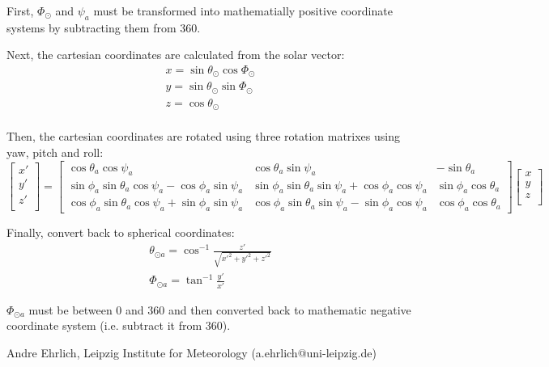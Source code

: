 { %
First, $\Phi_\odot$ and $\psi_a$ must be transformed into mathematially positive coordinate systems by subtracting them from 360. 

Next, the cartesian coordinates are calculated from the solar vector:
\begin{gather*}
x = \sin{\theta_\odot} \cos{\Phi_\odot} \\
y = \sin{\theta_\odot} \sin{\Phi_\odot} \\
z = \cos{\theta_\odot} \\
\end{gather*}

Then, the cartesian coordinates are rotated using three rotation matrixes using yaw, pitch and roll:
\begin{displaymath}
 \begin{bmatrix}
  x' \\
  y' \\
  z' \\
 \end{bmatrix} 
=
\begin{bmatrix}
 \cos{\theta_a} \cos{\psi_a} & \cos{\theta_a} \sin{\psi_a} & -\sin{\theta_a} \\
 \sin{\phi_a} \sin{\theta_a} \cos{\psi_a} - \cos{\phi_a} \sin{\psi_a} & \sin{\phi_a} \sin{\theta_a} \sin{\psi_a} + \cos{\phi_a} \cos{\psi_a} & \sin{\phi_a} \cos{\theta_a} \\
 \cos{\phi_a} \sin{\theta_a} \cos{\psi_a} + \sin{\phi_a} \sin{\psi_a} & \cos{\phi_a} \sin{\theta_a} \sin{\psi_a} - \sin{\phi_a} \cos{\psi_a} & \cos{\phi_a} \cos{\theta_a}
\end{bmatrix}
\begin{bmatrix}
 x \\
 y \\ 
 z \\
\end{bmatrix}
\end{displaymath}

Finally, convert back to spherical coordinates:
\begin{gather*}
 \theta_{\odot a} = \cos^{-1}{\frac{z'}{\sqrt{x'^2 + y'^2 + z'^2}}} \\
 \Phi_{\odot a} = \tan^{-1}{\frac{y'}{x'}}
\end{gather*}
%

$\Phi_{\odot a}$ must be between 0 and 360 and then converted back to mathematic negative coordinate system (i.e. subtract it from 360).


}
{ %
Andre Ehrlich, Leipzig Institute for Meteorology (a.ehrlich@uni-leipzig.de)
}
{ %

}


